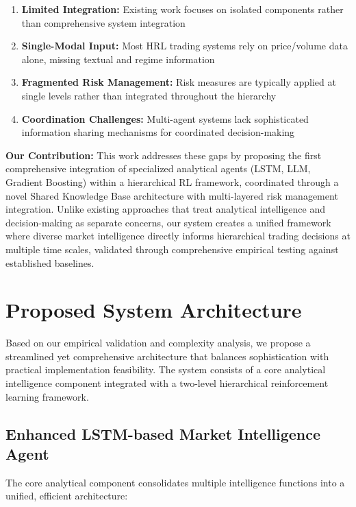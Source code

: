 \documentclass[11pt]{article}
\begin{document}
\begin{enumerate}
\item \textbf{Limited Integration:} Existing work focuses on isolated components rather than comprehensive system integration
\item \textbf{Single-Modal Input:} Most HRL trading systems rely on price/volume data alone, missing textual and regime information
\item \textbf{Fragmented Risk Management:} Risk measures are typically applied at single levels rather than integrated throughout the hierarchy
\item \textbf{Coordination Challenges:} Multi-agent systems lack sophisticated information sharing mechanisms for coordinated decision-making

\end{enumerate}
\textbf{Our Contribution:} This work addresses these gaps by proposing the first comprehensive integration of specialized analytical agents (LSTM, LLM, Gradient Boosting) within a hierarchical RL framework, coordinated through a novel Shared Knowledge Base architecture with multi-layered risk management integration. Unlike existing approaches that treat analytical intelligence and decision-making as separate concerns, our system creates a unified framework where diverse market intelligence directly informs hierarchical trading decisions at multiple time scales, validated through comprehensive empirical testing against established baselines.

\section{Proposed System Architecture}

Based on our empirical validation and complexity analysis, we propose a streamlined yet comprehensive architecture that balances sophistication with practical implementation feasibility. The system consists of a core analytical intelligence component integrated with a two-level hierarchical reinforcement learning framework.

\subsection{Enhanced LSTM-based Market Intelligence Agent}

The core analytical component consolidates multiple intelligence functions into a unified, efficient architecture:
\end{document}

